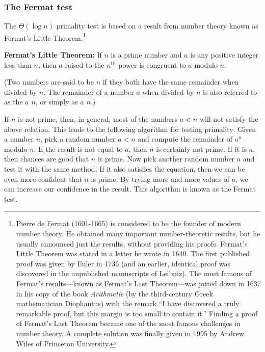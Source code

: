 \subsubsection*{The Fermat test}

The \( \Theta(\log n) \) primality test is based on a result from
number theory known as Fermat's Little Theorem.\footnote{Pierre de Fermat
(1601-1665) is considered to be the founder of modern number theory.  He
obtained many important number-theoretic results, but he usually announced just
the results, without providing his proofs.  Fermat's Little Theorem was stated
in a letter he wrote in 1640.  The first published proof was given by Euler in
1736 (and an earlier, identical proof was discovered in the unpublished
manuscripts of Leibniz).  The most famous of Fermat's results---known as
Fermat's Last Theorem---was jotted down in 1637 in his copy of the book
\textit{Arithmetic} (by the third-century Greek mathematician Diophantus) with
the remark ``I have discovered a truly remarkable proof, but this margin is too
small to contain it.''  Finding a proof of Fermat's Last Theorem became one of
the most famous challenges in number theory.  A complete solution was finally
given in 1995 by Andrew Wiles of Princeton University.}

\begin{niceQuote}
\textbf{Fermat's Little Theorem:} If \( n \) is a prime number and \( a \) is any
positive integer less than \( n \), then \( a \) raised to the \( n^{\mathrm{th}} \) power is
congruent to \( a \) modulo \( n \).
\end{niceQuote}

\noindent
(Two numbers are said to be  \( n \) if they both have
the same remainder when divided by \( n \).  The remainder of a number \( a \) when
divided by \( n \) is also referred to as the  \( a \)
 \( n \), or simply as \( a \)  \( n \).)

If \( n \) is not prime, then, in general, most of the numbers \( a < n \) will
not satisfy the above relation.  This leads to the following algorithm for
testing primality: Given a number \( n \), pick a random number \( a < n \) and
compute the remainder of \( a^n \) modulo \( n \).  If the result is not equal
to \( a \), then \( n \) is certainly not prime.  If it is \( a \), then chances are
good that \( n \) is prime.  Now pick another random number \( a \) and test it
with the same method.  If it also satisfies the equation, then we can be even
more confident that \( n \) is prime.  By trying more and more values of \( a \),
we can increase our confidence in the result.  This algorithm is known as the
Fermat test.

